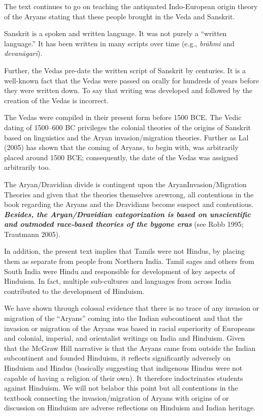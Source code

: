 The text continues to go on teaching the antiquated Indo-European origin theory of the Aryans stating that these people brought in the Veda and Sanskrit. 

Sanskrit is a spoken and written language. It was not purely a “written language.” It has been written in many scripts over time (e.g., \textit{brāhmi} and \textit{devanāgarī}). 

Further, the Vedas pre-date the written script of Sanskrit by centuries. It is a well-known fact that the Vedas were passed on orally for hundreds of years before they were written down. To say that writing was developed and followed by the creation of the Vedas is incorrect.

The Vedas were compiled in their present form before 1500 BCE. The Vedic dating of 1500--600 BC privileges the colonial theories of the origins of Sanskrit based on linguistics and the Aryan invasion/migration theories. Further as Lal (2005) has shown that the coming of Aryans, to begin with, was arbitrarily placed around 1500 BCE; consequently, the date of the Vedas was assigned arbitrarily too.

The Aryan/Dravidian divide is contingent upon the Aryan\break Invasion/Migration Theories and given that the theories themselves are\break wrong, all contentions in the book regarding the Aryans and the Dravidians become suspect and contentious. \textit{\textbf{Besides, the Aryan/Dravidian categorization is based on unscientific and outmoded race-based theories of the bygone eras}} (see Robb 1995; Trautmann 2005). 

In addition, the present text implies that Tamils were not Hindus, by placing them as separate from people from Northern India. Tamil sages and others from South India were Hindu and responsible for development of key aspects of Hinduism. In fact, multiple sub-cultures and languages from across India contributed to the development of Hinduism.

We have shown through colossal evidence that there is no trace of any invasion or migration of the “Aryans” coming into the Indian subcontinent and that the invasion or migration of the Aryans was based in racial superiority of Europeans and colonial, imperial, and orientalist writings on India and Hinduism. Given that the McGraw Hill narrative is that the Aryans came from outside the Indian subcontinent and founded Hinduism, it reflects significantly adversely on Hinduism and Hindus (basically suggesting that indigenous Hindus were not capable of having a religion of their own). It therefore indoctrinates students against Hinduism. We will not belabor this point but all contentions in the textbook connecting the invasion/migration of Aryans with origins of or discussion on Hinduism are adverse reflections on Hinduism and Indian heritage.

